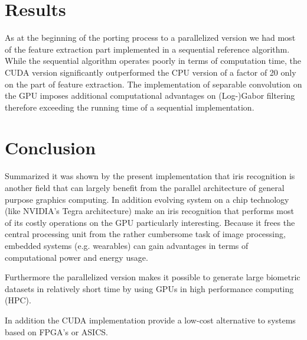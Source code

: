 \documentclass[journal]{IEEEtran}
\begin{document}
\section{Results}
As at the beginning of the porting process to a parallelized version we had most of the feature extraction part implemented in a sequential reference algorithm. While the sequential algorithm operates poorly in terms of computation time, the CUDA version significantly outperformed the CPU version of a factor of 20 only on the part of feature extraction. The implementation of separable convolution on the GPU imposes additional computational advantages on (Log-)Gabor filtering therefore exceeding the running time of a sequential implementation.
\section{Conclusion}
Summarized it was shown by the present implementation that iris recognition is another field that can largely benefit from the parallel architecture of general purpose graphics computing. In addition evolving system on a chip technology (like NVIDIA's Tegra architecture) make an iris recognition that performs most of its costly operations on the GPU particularly interesting. Because it frees the central processing unit from the rather cumbersome task of image processing, embedded systems (e.g. wearables) can gain advantages in terms of computational power and energy usage.
\par Furthermore the parallelized version makes it possible to generate large biometric datasets in relatively short time by using GPUs in high performance computing (HPC).
\par In addition the CUDA implementation provide a low-cost alternative to systems based on FPGA's or ASICS.
\newpage

 
\end{document}
